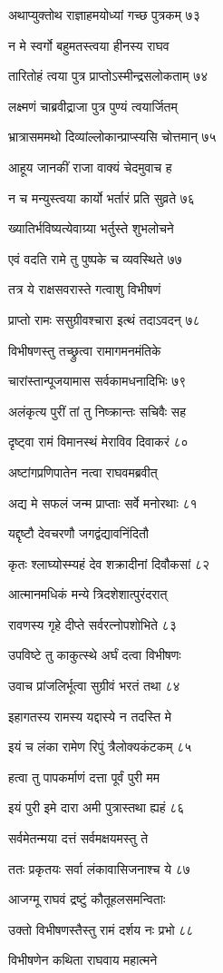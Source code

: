 अथाप्युक्तोथ राज्ञाहमयोध्यां गच्छ पुत्रकम् ७३

न मे स्वर्गो बहुमतस्त्वया हीनस्य राघव

तारितोहं त्वया पुत्र प्राप्तोऽस्मीन्द्रसलोकताम् ७४

लक्ष्मणं चाब्रवीद्राजा पुत्र पुण्यं त्वयार्जितम्

भ्रात्रासममथो दिव्यांल्लोकान्प्राप्स्यसि चोत्तमान् ७५

आहूय जानकीं राजा वाक्यं चेदमुवाच ह

न च मन्युस्त्वया कार्यो भर्तारं प्रति सुव्रते ७६

ख्यातिर्भविष्यत्येवाग्र्या भर्तुस्ते शुभलोचने

एवं वदति रामे तु पुष्पके च व्यवस्थिते ७७

तत्र ये राक्षसवरास्ते गत्वाशु विभीषणं

प्राप्तो रामः ससुग्रीवश्चारा इत्थं तदाऽवदन् ७८

विभीषणस्तु तच्छ्रुत्वा रामागमनमंतिके

चारांस्तान्पूजयामास सर्वकामधनादिभिः ७९

अलंकृत्य पुरीं तां तु निष्क्रान्तः सचिवैः सह

दृष्ट्वा रामं विमानस्थं मेराविव दिवाकरं ८०

अष्टांगप्रणिपातेन नत्वा राघवमब्रवीत्

अद्य मे सफलं जन्म प्राप्ताः सर्वे मनोरथाः ८१

यद्दृष्टौ देवचरणौ जगद्वंद्यावनिंदितौ

कृतः श्लाघ्योस्म्यहं देव शक्रादीनां दिवौकसां ८२

आत्मानमधिकं मन्ये त्रिदशेशात्पुरंदरात्

रावणस्य गृहे दीप्ते सर्वरत्नोपशोभिते ८३

उपविष्टे तु काकुत्स्थे अर्घं दत्वा विभीषणः

उवाच प्रांजलिर्भूत्वा सुग्रीवं भरतं तथा ८४

इहागतस्य रामस्य यद्दास्ये न तदस्ति मे

इयं च लंका रामेण रिपुं त्रैलोक्यकंटकम् ८५

हत्वा तु पापकर्माणं दत्ता पूर्वं पुरी मम

इयं पुरी इमे दारा अमी पुत्रास्तथा ह्यहं ८६

सर्वमेतन्मया दत्तं सर्वमक्षयमस्तु ते

ततः प्रकृतयः सर्वा लंकावासिजनाश्च ये ८७

आजग्मू राघवं द्रष्टुं कौतूहलसमन्विताः

उक्तो विभीषणस्तैस्तु रामं दर्शय नः प्रभो ८८

विभीषणेन कथिता राघवाय महात्मने

